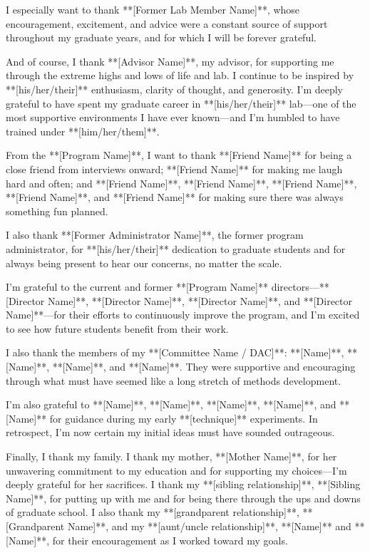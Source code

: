 I especially want to thank **[Former Lab Member Name]**, whose encouragement, excitement, and advice were a constant source of support throughout my graduate years, and for which I will be forever grateful.

And of course, I thank **[Advisor Name]**, my advisor, for supporting me through the extreme highs and lows of life and lab. I continue to be inspired by **[his/her/their]** enthusiasm, clarity of thought, and generosity. I’m deeply grateful to have spent my graduate career in **[his/her/their]** lab—one of the most supportive environments I have ever known—and I’m humbled to have trained under **[him/her/them]**.

From the **[Program Name]**, I want to thank **[Friend Name]** for being a close friend from interviews onward; **[Friend Name]** for making me laugh hard and often; and **[Friend Name]**, **[Friend Name]**, **[Friend Name]**, **[Friend Name]**, and **[Friend Name]** for making sure there was always something fun planned.

I also thank **[Former Administrator Name]**, the former program administrator, for **[his/her/their]** dedication to graduate students and for always being present to hear our concerns, no matter the scale.

I’m grateful to the current and former **[Program Name]** directors—**[Director Name]**, **[Director Name]**, **[Director Name]**, and **[Director Name]**—for their efforts to continuously improve the program, and I’m excited to see how future students benefit from their work.

I also thank the members of my **[Committee Name / DAC]**: **[Name]**, **[Name]**, **[Name]**, and **[Name]**. They were supportive and encouraging through what must have seemed like a long stretch of methods development.

\begin{sloppypar}
I’m also grateful to **[Name]**, **[Name]**, **[Name]**, **[Name]**, and **[Name]** for guidance during my early **[technique]** experiments. In retrospect, I’m now certain my initial ideas must have sounded outrageous.
\end{sloppypar}

Finally, I thank my family. I thank my mother, **[Mother Name]**, for her unwavering commitment to my education and for supporting my choices—I’m deeply grateful for her sacrifices. I thank my **[sibling relationship]**, **[Sibling Name]**, for putting up with me and for being there through the ups and downs of graduate school. I also thank my **[grandparent relationship]**, **[Grandparent Name]**, and my **[aunt/uncle relationship]**, **[Name]** and **[Name]**, for their encouragement as I worked toward my goals.
